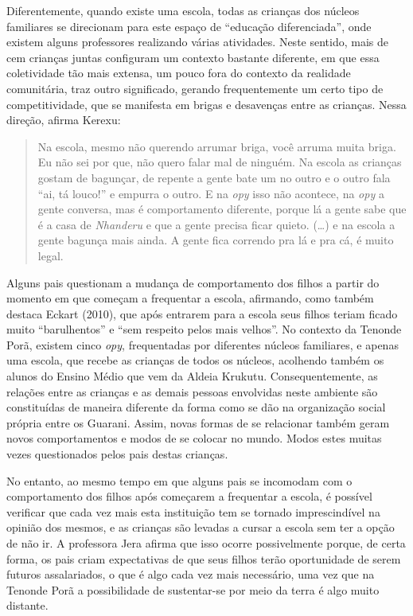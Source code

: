 Diferentemente, quando existe uma escola, todas as crianças dos núcleos
familiares se direcionam para este espaço de ``educação diferenciada'',
onde existem alguns professores realizando várias atividades. Neste
sentido, mais de cem crianças juntas configuram um contexto bastante
diferente, em que essa coletividade tão mais extensa, um pouco fora do
contexto da realidade comunitária, traz outro significado, gerando
frequentemente um certo tipo de competitividade, que se manifesta em
brigas e desavenças entre as crianças. Nessa direção, afirma Kerexu:

\begin{quotation}
Na escola, mesmo não querendo arrumar briga, você arruma muita briga. Eu
não sei por que, não quero falar mal de ninguém. Na escola as crianças
gostam de bagunçar, de repente a gente bate um no outro e o outro fala
``ai, tá louco!'' e empurra o outro. E na \emph{opy} isso não acontece, na \emph{opy} a
gente conversa, mas é comportamento diferente, porque lá a gente sabe
que é a casa de \emph{Nhanderu} e que a gente precisa ficar quieto. (\ldots{}) e na
escola a gente bagunça mais ainda. A gente fica correndo pra lá e pra
cá, é muito legal.
\end{quotation}

Alguns pais questionam a mudança de comportamento dos filhos a partir do
momento em que começam a frequentar a escola, afirmando, como também
destaca Eckart (2010), que após entrarem para a escola seus filhos
teriam ficado muito ``barulhentos'' e ``sem respeito pelos mais velhos''.
No contexto da Tenonde Porã, existem cinco \emph{opy}, frequentadas por
diferentes núcleos familiares, e apenas uma escola, que recebe as
crianças de todos os núcleos, acolhendo também os alunos do Ensino
Médio que vem da Aldeia Krukutu. Consequentemente, as relações entre as
crianças e as demais pessoas envolvidas neste ambiente são constituídas
de maneira diferente da forma como se dão na organização social própria
entre os Guarani. Assim, novas formas de se relacionar também geram
novos comportamentos e modos de se colocar no mundo. Modos estes muitas
vezes questionados pelos pais destas crianças. 

No entanto, ao mesmo tempo em que alguns pais se incomodam com o
comportamento dos filhos após começarem a frequentar a escola, é
possível verificar que cada vez mais esta instituição tem se tornado
imprescindível na opinião dos mesmos, e as crianças são levadas a
cursar a escola sem ter a opção de não ir. A professora Jera afirma que
isso ocorre possivelmente porque, de certa forma, os pais criam
expectativas de que seus filhos terão oportunidade de serem futuros
assalariados, o que é algo cada vez mais necessário, uma vez que na
Tenonde Porã a possibilidade de sustentar-se por meio da terra é algo
muito distante.

